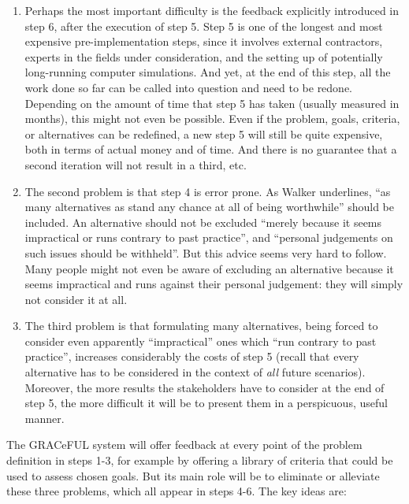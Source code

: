 \documentclass[]{article}
\begin{document}
\begin{enumerate}
\def\labelenumi{\alph{enumi}.}
\item
  Perhaps the most important difficulty is the feedback explicitly
  introduced in step 6, after the execution of step 5. Step 5 is one of
  the longest and most expensive pre-implementation steps, since it
  involves external contractors, experts in the fields under
  consideration, and the setting up of potentially long-running computer
  simulations. And yet, at the end of this step, all the work done so
  far can be called into question and need to be redone. Depending on
  the amount of time that step 5 has taken (usually measured in months),
  this might not even be possible. Even if the problem, goals, criteria,
  or alternatives can be redefined, a new step 5 will still be quite
  expensive, both in terms of actual money and of time. And there is no
  guarantee that a second iteration will not result in a third, etc.
\item
  The second problem is that step 4 is error prone. As Walker
  underlines, ``as many alternatives as stand any chance at all of being
  worthwhile'' should be included. An alternative should not be excluded
  ``merely because it seems impractical or runs contrary to past
  practice'', and ``personal judgements on such issues should be
  withheld''. But this advice seems very hard to follow. Many people
  might not even be aware of excluding an alternative because it seems
  impractical and runs against their personal judgement: they will
  simply not consider it at all.
\item
  The third problem is that formulating many alternatives, being forced
  to consider even apparently ``impractical'' ones which ``run contrary
  to past practice'', increases considerably the costs of step 5 (recall
  that every alternative has to be considered in the context of
  \emph{all} future scenarios). Moreover, the more results the
  stakeholders have to consider at the end of step 5, the more difficult
  it will be to present them in a perspicuous, useful manner.
\end{enumerate}

The GRACeFUL system will offer feedback at every point of the problem
definition in steps 1-3, for example by offering a library of criteria
that could be used to assess chosen goals. But its main role will be to
eliminate or alleviate these three problems, which all appear in steps
4-6. The key ideas are:
\end{document}
